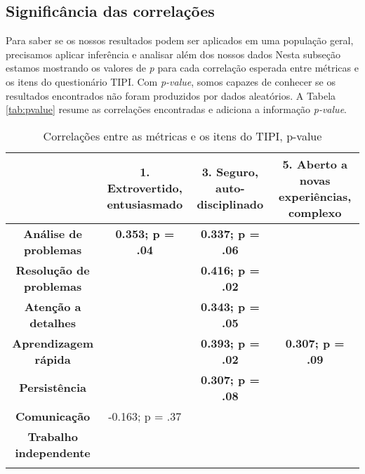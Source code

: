 \subsection{Significância das correlações}

Para saber se os nossos resultados podem ser aplicados em uma população geral, precisamos aplicar inferência e analisar além dos nossos dados
Nesta subseção estamos mostrando os valores de \textit{p} para cada correlação esperada entre métricas e os itens do questionário TIPI.
Com \textit{p-value}, somos capazes de conhecer se os resultados encontrados não foram produzidos por dados aleatórios.
A Tabela \ref{tab:pvalue} resume as correlações encontradas e adiciona a informação \textit{p-value}.

\begin{sidewaystable}[ph!]
\footnotesize
\caption{\small Correlações entre as métricas e os itens do TIPI, p-value}
\addtolength{\tabcolsep}{1pt}
\centering
\begin{tabular}{lccc}

    \toprule
          & \textbf{1. Extrovertido, entusiasmado} & \textbf{3. Seguro, auto-disciplinado} & \textbf{5. Aberto a novas experiências, complexo} \\
    \midrule
    \multicolumn{1}{c}{\textbf{Análise de problemas}} 	& \textbf{0.353; p = .04} & \textbf{0.337; p = .06} & \textbf{} \\
    \multicolumn{1}{c}{\textbf{Resolução de problemas}} &													& \textbf{0.416; p = .02} & \textbf{} \\
    \multicolumn{1}{c}{\textbf{Atenção a detalhes}} 		&													& \textbf{0.343; p = .05} &  \\
    \multicolumn{1}{c}{\textbf{Aprendizagem rápida}} 		&													& \textbf{0.393; p = .02} & \textbf{0.307; p = .09} \\
    \multicolumn{1}{c}{\textbf{Persistência}} 					&													& \textbf{0.307; p = .08} &  \\
    \multicolumn{1}{c}{\textbf{Comunicação}} 						& -0.163; p = .37					&													&  \\
    \multicolumn{1}{c}{\textbf{Trabalho independente}} 	&													&													&  \\
		
          &  &  &  \\


\end{tabular}
\end{sidewaystable}
